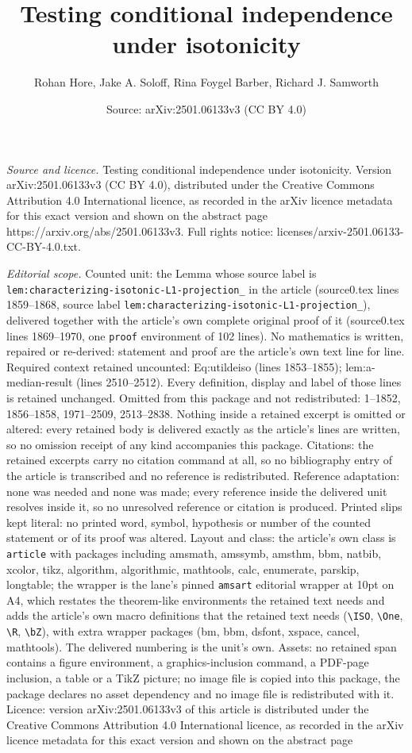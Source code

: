 \documentclass[10pt,a4paper]{amsart}
\title[Testing conditional independence under isotonicity]{Testing conditional independence under isotonicity}
\author{Rohan Hore, Jake A. Soloff, Rina Foygel Barber, Richard J. Samworth}
\date{Source: arXiv:2501.06133v3 (CC BY 4.0)}
\begin{document}
\maketitle

\noindent\emph{Source and licence.} Testing conditional independence under isotonicity. Version arXiv:2501.06133v3 (CC BY 4.0), distributed under the Creative Commons Attribution 4.0 International licence, as recorded in the arXiv licence metadata for this exact version and shown on the abstract page https://arxiv.org/abs/2501.06133v3. Full rights notice: licenses/arxiv-2501.06133-CC-BY-4.0.txt.\par\smallskip

\noindent\textit{Editorial scope.} Counted unit: the Lemma whose source label is \texttt{lem:characterizing-isotonic-L1-projection\_} in the article (source0.tex lines 1859--1868, source label \texttt{lem:characterizing-isotonic-L1-projection\_}), delivered together with the article's own complete original proof of it (source0.tex lines 1869--1970, one \texttt{proof} environment of 102 lines). No mathematics is written, repaired or re-derived: statement and proof are the article's own text line for line. Required context retained uncounted: Eq:utildeiso (lines 1853--1855); lem:a-median-result (lines 2510--2512). Every definition, display and label of those lines is retained unchanged. Omitted from this package and not redistributed: 1--1852, 1856--1858, 1971--2509, 2513--2838. Nothing inside a retained excerpt is omitted or altered: every retained body is delivered exactly as the article's lines are written, so no omission receipt of any kind accompanies this package. Citations: the retained excerpts carry no citation command at all, so no bibliography entry of the article is transcribed and no reference is redistributed. Reference adaptation: none was needed and none was made; every reference inside the delivered unit resolves inside it, so no unresolved reference or citation is produced. Printed slips kept literal: no printed word, symbol, hypothesis or number of the counted statement or of its proof was altered. Layout and class: the article's own class is \texttt{article} with packages including amsmath, amssymb, amsthm, bbm, natbib, xcolor, tikz, algorithm, algorithmic, mathtools, calc, enumerate, parskip, longtable; the wrapper is the lane's pinned \texttt{amsart} editorial wrapper at 10pt on A4, which restates the theorem-like environments the retained text needs and adds the article's own macro definitions that the retained text needs (\texttt{\textbackslash ISO}, \texttt{\textbackslash One}, \texttt{\textbackslash R}, \texttt{\textbackslash bZ}), with extra wrapper packages (bm, bbm, dsfont, xspace, cancel, mathtools). The delivered numbering is the unit's own. Assets: no retained span contains a figure environment, a graphics-inclusion command, a PDF-page inclusion, a table or a TikZ picture; no image file is copied into this package, the package declares no asset dependency and no image file is redistributed with it. Licence: version arXiv:2501.06133v3 of this article is distributed under the Creative Commons Attribution 4.0 International licence, as recorded in the arXiv licence metadata for this exact version and shown on the abstract page 
\end{document}
